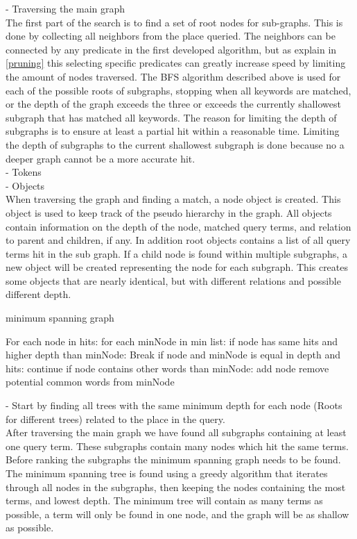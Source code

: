- Traversing the main graph\\
The first part of the search is to find a set of root nodes for sub-graphs. This is done by collecting all neighbors from the place queried. The neighbors can be connected by any predicate in the first developed algorithm, but as explain in \ref{pruning} this selecting specific predicates can greatly increase speed by limiting the amount of nodes traversed. The BFS algorithm described above is used for each of the possible roots of subgraphs, stopping when all keywords are matched, or the depth of the graph exceeds the three or exceeds the currently shallowest subgraph that has matched all keywords. The reason for limiting the depth of subgraphs is to ensure at least a partial hit within a reasonable time. Limiting the depth of subgraphs to the current shallowest subgraph is done because no a deeper graph cannot be a more accurate hit.\\
- Tokens\\
- Objects\\
When traversing the graph and finding a match, a node object is created. This object is used to keep track of the pseudo hierarchy in the graph. All objects contain information on the depth of the node, matched query terms, and relation to parent and children, if any. In addition root objects contains a list of all query terms hit in the sub graph. If a child node is found within multiple subgraphs, a new object will be created representing the node for each subgraph. This creates some objects that are nearly identical, but with different relations and possible different depth.\\

\begin{algorithm}
\caption{minimum spanning graph}
\begin{algorithmic}[1]
For each node in hits:
	for each minNode in min list:
		if node has same hits and higher depth than minNode:
			Break
		if node and minNode is equal in depth and hits:
			continue
		if node contains other words than minNode:
			add node
			remove potential common words from minNode
\EndProcedure
\end{algorithmic}
\end{algorithm}

- Start by finding all trees with the same  minimum depth for each node (Roots for different trees) related to the place in the query.\\
After traversing the main graph we have found all subgraphs containing at least one query term. These subgraphs contain many nodes which hit the same terms. Before ranking the subgraphs the minimum spanning graph needs to be found. The minimum spanning tree is found using a greedy algorithm that iterates through all nodes in the subgraphs, then keeping the nodes containing the most terms, and lowest depth. The minimum tree will contain as many terms as possible, a term will only be found in one node, and the graph will be as shallow as possible.\\

